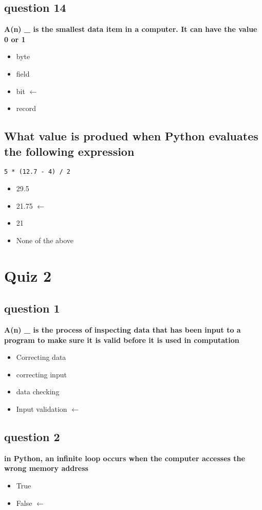 \documentclass[10pt]{article}
\begin{document}
\subsection*{question 14}
\textbf{A(n) \_ is the smallest data item in a computer. It can have the value 0 or 1}
\begin{itemize}
\item byte
\item field
\item bit $\leftarrow$
\item record
\end{itemize}
\subsection*{What value is produed when Python evaluates the following expression}
\begin{verbatim}
5 * (12.7 - 4) / 2
\end{verbatim}
\begin{itemize}
\item 29.5
\item 21.75 $\leftarrow$
\item 21
\item None of the above
\end{itemize}
\break
\section*{Quiz 2}
\subsection*{question 1}
\textbf{A(n) \_ is the process of inspecting data that has been input to a program to make sure it is valid before it is used in computation}
\begin{itemize}
\item Correcting data
\item correcting input
\item data checking
\item Input validation $\leftarrow$
\end{itemize}
\subsection*{question 2}
\textbf{in Python, an infinite loop occurs when the computer accesses the wrong memory address}
\begin{itemize}
\item True
\item False $\leftarrow$
\end{itemize}
\end{document}
